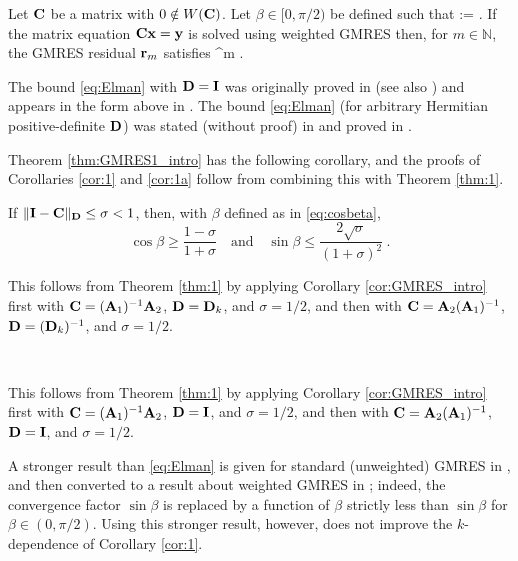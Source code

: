 
\begin{theorem}\label{thm:GMRES1_intro} 
Let $\mathbf{C}$ be a matrix with $0\notin W(\mathbf{C})$. Let $\beta\in[0,\pi/2)$ be defined such that
\beq\label{eq:cosbeta}
\cos \beta := .
\eeq
If the matrix equation $\mathbf{C} \mathbf{x} = \mathbf{y}$ is solved using weighted GMRES then, 
for $m\in \mathbb{N}$, the GMRES residual $\mathbf{r}_m$ %
satisfies
\beq\label{eq:Elman}
 \leq \sin^m \beta. %
\eeq
\end{theorem}
The bound \eqref{eq:Elman} with $\mathbf{D}=\mathbf{I}$ was originally proved in \cite{El:82} (see also \cite[Theorem 3.3]{EiElSc:83}) and appears in the form above in \cite[Equation 1.2]{BeGoTy:06}. The bound \eqref{eq:Elman} (for arbitrary Hermitian positive-definite $\mathbf{D}$) was stated (without proof) in \cite{CaWi:92} and proved in \cite[Theorem 5.1]{GrSpVa:17}. %



Theorem \ref{thm:GMRES1_intro} has the following corollary, and the proofs of Corollaries \ref{cor:1} and \ref{cor:1a} follow from combining this with Theorem \ref{thm:1}.

\begin{corollary}
\label{cor:GMRES_intro} 
If $\|\mathbf{I} - \mathbf{C} \|_{\mathbf{D}} \leq \sigma < 1$, then, with $\beta$ defined as in \eqref{eq:cosbeta},
$$\cos \beta \geq \frac{1-\sigma}{1+\sigma} \quad \text{and} \quad
\sin \beta \leq \frac{2 \sqrt{\sigma}}{(1+\sigma)^2} \ . $$
\end{corollary}

This follows from Theorem \ref{thm:1} by applying Corollary \ref{cor:GMRES_intro} first with $\mathbf{C}= (\mathbf{A}_{1})^{-1} \mathbf{A}_{2}$, $\mathbf{D}=\mathbf{D}_k$, and $\sigma=1/2$, and then with $\mathbf{C}= \mathbf{A}_{2}(\mathbf{A}_{1})^{-1} $, $\mathbf{D}=(\mathbf{D}_k)^{-1}$, and $\sigma=1/2$.
\epf

\

This follows from Theorem \ref{thm:1} by applying Corollary \ref{cor:GMRES_intro} first with $\mathbf{C}= (\mathbf{A}_{1})^{-1} \mathbf{A}_{2}$, $\mathbf{D}=\mathbf{I}$, and $\sigma=1/2$, and then with $\mathbf{C}= \mathbf{A}_{2}(\mathbf{A}_{1})^{-1} $, $\mathbf{D}=\mathbf{I}$, and $\sigma=1/2$.
\epf


A stronger result than \eqref{eq:Elman} is given for standard (unweighted) GMRES in \cite[Theorem 2.1]{BeGoTy:06}, and then converted to a result about weighted GMRES in \cite[Theorem 5.3]{BoDoGrSpTo:19}; indeed, the convergence factor $\sin \beta$ is replaced by a function of $\beta$ strictly less than $\sin\beta$ for $\beta\in (0,\pi/2)$. Using this stronger result, however, does not improve the $k$-dependence of Corollary \ref{cor:1}.
\ere


